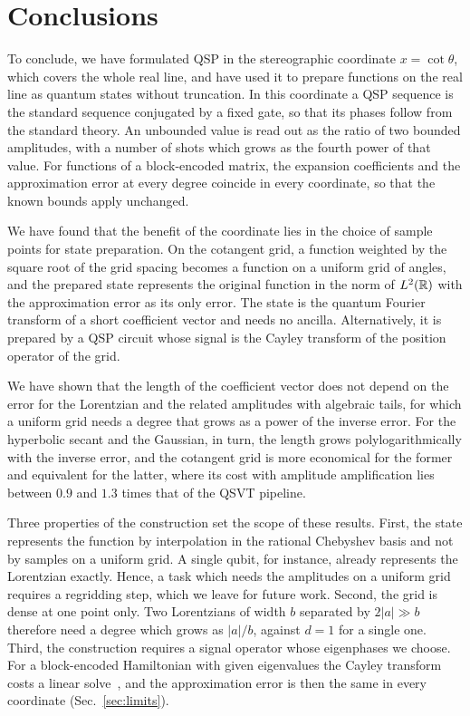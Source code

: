 \section{Conclusions}
\label{sec:discussion}

To conclude, we have formulated QSP in the stereographic
coordinate $x=\cot\theta$, which covers the whole real line, and
have used it to prepare functions on the real line as quantum
states without truncation.  In this coordinate a QSP sequence is
the standard sequence conjugated by a fixed gate, so that its
phases follow from the standard theory.  An unbounded value is
read out as the ratio of two bounded amplitudes, with a number of
shots which grows as the fourth power of that value.  For functions of a block-encoded matrix, the expansion
coefficients and the approximation error at every degree coincide
in every coordinate, so that the known bounds apply unchanged.

We have found that the benefit of the coordinate lies in the
choice of sample points for state preparation.  On the cotangent grid, a function weighted
by the square root of the grid spacing becomes a function on a
uniform grid of angles, and the prepared state represents the
original function in the norm of $L^2(\mathbb{R})$ with the approximation
error as its only error.  The state is the quantum Fourier
transform of a short coefficient vector and needs no ancilla.
Alternatively, it is prepared by a QSP circuit whose signal is the
Cayley transform of the position operator of the grid.

We have shown that the length of the coefficient vector does not
depend on the error for the Lorentzian and the related amplitudes with algebraic tails, for
which a uniform grid needs a degree that grows as a power of the
inverse error.  For the hyperbolic secant and the Gaussian, in
turn, the length grows polylogarithmically with the inverse error,
and the cotangent grid is more economical for the former and
equivalent for the latter, where its cost with amplitude
amplification lies between $0.9$ and $1.3$ times that of the QSVT
pipeline.

Three properties of the construction set the scope of these
results.  First, the state
represents the function by interpolation in the rational Chebyshev
basis and not by samples on a uniform grid.  A single qubit, for
instance, already represents the Lorentzian exactly.  Hence, a
task which needs the amplitudes on a uniform grid requires a
regridding step, which we leave for future work.
Second, the grid is dense at one point only.  Two Lorentzians of
width $b$ separated by $2|a|\gg b$ therefore need a degree which
grows as $|a|/b$, against $d=1$ for a single one.  Third, the construction requires a signal
operator whose eigenphases we choose.  For a block-encoded
Hamiltonian with given eigenvalues the Cayley transform costs a
linear solve~\cite{DelCorso2026}, and the approximation error
is then the same in every coordinate (Sec.~\ref{sec:limits}).

